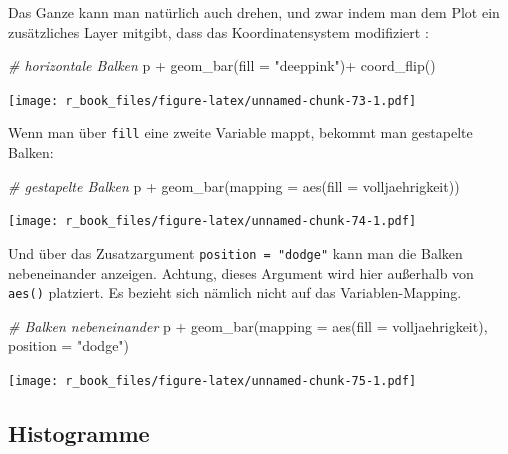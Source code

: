 \documentclass[
]{book}
\newenvironment{Shaded}{\begin{snugshade}}{\end{snugshade}}
\newcommand{\AttributeTok}[1]{\textcolor[rgb]{0.77,0.63,0.00}{#1}}
\newcommand{\CommentTok}[1]{\textcolor[rgb]{0.56,0.35,0.01}{\textit{#1}}}
\newcommand{\FunctionTok}[1]{\textcolor[rgb]{0.00,0.00,0.00}{#1}}
\newcommand{\NormalTok}[1]{#1}
\newcommand{\SpecialCharTok}[1]{\textcolor[rgb]{0.00,0.00,0.00}{#1}}
\newcommand{\StringTok}[1]{\textcolor[rgb]{0.31,0.60,0.02}{#1}}
\begin{document}
Das Ganze kann man natürlich auch drehen, und zwar indem man dem Plot ein zusätzliches Layer mitgibt, dass das Koordinatensystem modifiziert :

\begin{Shaded}
\begin{Highlighting}[]
\CommentTok{\# horizontale Balken}
\NormalTok{p }\SpecialCharTok{+} \FunctionTok{geom\_bar}\NormalTok{(}\AttributeTok{fill =} \StringTok{"deeppink"}\NormalTok{)}\SpecialCharTok{+} 
  \FunctionTok{coord\_flip}\NormalTok{()}
\end{Highlighting}
\end{Shaded}

\texttt{[image: r\_book\_files/figure-latex/unnamed-chunk-73-1.pdf]}

Wenn man über \texttt{fill} eine zweite Variable mappt, bekommt man gestapelte Balken:

\begin{Shaded}
\begin{Highlighting}[]
\CommentTok{\# gestapelte Balken}
\NormalTok{p }\SpecialCharTok{+} \FunctionTok{geom\_bar}\NormalTok{(}\AttributeTok{mapping =} \FunctionTok{aes}\NormalTok{(}\AttributeTok{fill =}\NormalTok{ volljaehrigkeit)) }
\end{Highlighting}
\end{Shaded}

\texttt{[image: r\_book\_files/figure-latex/unnamed-chunk-74-1.pdf]}

Und über das Zusatzargument \texttt{position\ =\ "dodge"} kann man die Balken nebeneinander anzeigen. Achtung, dieses Argument wird hier außerhalb von \texttt{aes()} platziert. Es bezieht sich nämlich nicht auf das Variablen-Mapping.

\begin{Shaded}
\begin{Highlighting}[]
\CommentTok{\# Balken nebeneinander}
\NormalTok{p }\SpecialCharTok{+} \FunctionTok{geom\_bar}\NormalTok{(}\AttributeTok{mapping =} \FunctionTok{aes}\NormalTok{(}\AttributeTok{fill =}\NormalTok{ volljaehrigkeit), }\AttributeTok{position =} \StringTok{"dodge"}\NormalTok{) }
\end{Highlighting}
\end{Shaded}

\texttt{[image: r\_book\_files/figure-latex/unnamed-chunk-75-1.pdf]}

\hypertarget{histogramme}{%
\subsection{Histogramme}\label{histogramme}}
\end{document}
